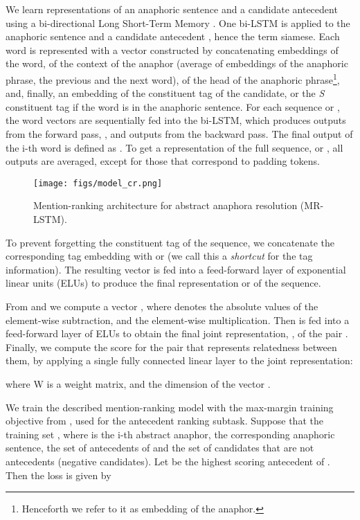\documentclass[11pt,letterpaper]{article}
\begin{document}
We learn representations of an anaphoric sentence  and a candidate antecedent  using a bi-directional
Long Short-Term Memory \cite{hochreiter1997long, Graves2005FramewisePC}.
One bi-LSTM is applied to the anaphoric sentence  and a candidate antecedent , hence the term siamese. Each word is represented with a vector 
constructed by concatenating embeddings of
the word, 
of the context of the anaphor (average of embeddings of the anaphoric phrase, the previous and the next word),
of the head of the anaphoric phrase\footnote{Henceforth we refer to it as embedding of the anaphor.}, and, finally,
an embedding of the constituent tag of the candidate, or 
the \textit{S} constituent tag if the word is in the anaphoric sentence.
For each sequence  or ,
the word vectors  are sequentially fed into the bi-LSTM, which produces outputs
from the forward pass, , and outputs  from the backward pass. The final output of the i-th word is defined as . To get a representation of 
the full sequence,  or ,  
all outputs are averaged, except for those that
correspond to padding tokens. 

\begin{figure}
\begin{center}
\texttt{[image: figs/model\_cr.png]}
\caption{Mention-ranking architecture for abstract anaphora resolution (MR-LSTM).}
\vspace*{-3mm}
\label{fig:architecture}
\end{center}
\end{figure}


To prevent forgetting 
the constituent tag of the sequence,
we concatenate the corresponding tag embedding with  or  (we call this a
\textit{shortcut} for the tag information). The resulting vector is fed into a feed-forward layer of exponential linear units (ELUs) \cite{Clevert2015FastAA} to produce the final representation  or  of the sequence. 

From  and  we compute a 
vector  \cite{Tai2015ImprovedSR}, where   denotes the absolute values of the element-wise subtraction, and   the element-wise multiplication. Then  is fed into a feed-forward layer of ELUs to obtain the final joint representation, , of the pair .
Finally, we compute the score for the pair  that represents relatedness between them, by applying a single fully connected linear layer to the joint representation:

where W is a  weight matrix, and  the dimension of the vector .

We train the described mention-ranking model with the 
max-margin training objective from \citet{wiseman2015learning}, used for the antecedent ranking subtask. 
Suppose that the training set , where  is the i-th abstract anaphor,  the corresponding anaphoric sentence,  the set of antecedents of  and  the set of candidates that are not antecedents (negative candidates). Let  be the highest scoring antecedent of . Then the loss is given by
\end{document}
